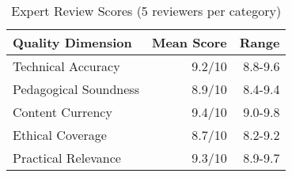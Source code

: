\begin{table}[H]
\centering
\caption{Expert Review Scores (5 reviewers per category)}
\label{tab:expert-review}
\begin{tabular}{@{}lrr@{}}
\toprule
\textbf{Quality Dimension} & \textbf{Mean Score} & \textbf{Range} \\
\midrule
Technical Accuracy & 9.2/10 & 8.8-9.6 \\
Pedagogical Soundness & 8.9/10 & 8.4-9.4 \\
Content Currency & 9.4/10 & 9.0-9.8 \\
Ethical Coverage & 8.7/10 & 8.2-9.2 \\
Practical Relevance & 9.3/10 & 8.9-9.7 \\
\bottomrule
\end{tabular}
\end{table}